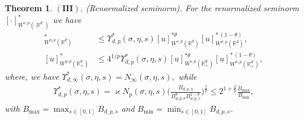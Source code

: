 \documentclass[12pt, reqno]{amsart}%
\theoremstyle{plain}  %
\newtheorem{theorem}{Theorem}[section]
\theoremstyle{definition}  %
\theoremstyle{remark}
\numberwithin{equation}{section}
\DeclareMathOperator{\R}{\mathbb{R}}
\begin{document}
\begin{theorem}
$\mathbf{(III)}$. (Renormalized seminorm).  For the renormalized seminorm $[\cdot]^*_{W^{s,p}(\R^d)}$ we have
\begin{align*}
[u]^*_{W^{\eta,p}(\mathbb{R}^d)}
&\leq
\Upsilon^*_{d,p}(\sigma,\eta,s)
[u]_{W^{s,p}(\mathbb{R}^d)}^{*\theta}
[u]_{W^{\sigma,p}(\mathbb{R}^d)}^{*\,(1-\theta)},
\\
[u]^*_{W^{\eta,p}(\mathbb{R}^d_+)}
&\leq
4^{1/p}\Upsilon^*_{d,p}(\sigma,\eta,s)
[u]_{W^{s,p}(\mathbb{R}^d_+)}^{*\theta}
[u]_{W^{\sigma,p}(\mathbb{R}^d_+)}^{*\,(1-\theta)},
\end{align*}
where, we have  $\Upsilon^*_{d,\infty}(\sigma,\eta,s)=N_\infty(\sigma,\eta,s),$ while
\begin{align*}
\Upsilon^*_{d,p}(\sigma,\eta,s)
=\varkappa N_p(\sigma,\eta,s) \Big(\frac{B_{d,p,\eta}}
{B_{d,p,\sigma}^{\theta}B_{d,p,s}^{1-\theta}}
\Big)^{\frac{1}{p}} \leq 2^{1+\frac{2}{p}}\frac{B_{\max}}{B_{\min}},
\end{align*}
with  $B_{\max}= \max_{s\in [0,1]} B_{d,p,s}$ and $B_{\min}= \min_{s\in [0,1]} B_{d,p,s}$.
\end{theorem}
\smallskip
\end{document}
